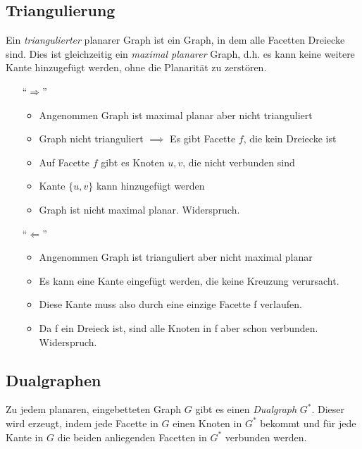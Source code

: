 \documentclass[10pt,a4paper]{article}
\begin{document}
\subsection{Triangulierung}
Ein \textit{triangulierter} planarer Graph ist ein Graph, in dem alle Facetten
Dreiecke sind.
Dies ist gleichzeitig ein \textit{maximal planarer} Graph, d.h. es kann keine
weitere Kante hinzugefügt werden, ohne die Planarität zu zerstören.
\begin{itemize}
    \item[\enquote{$\Longrightarrow$}]
        \begin{itemize}
            \item Angenommen Graph ist maximal planar aber nicht trianguliert
            \item Graph nicht trianguliert $\implies$ Es gibt Facette $f$, die
                kein Dreiecke ist
            \item Auf Facette $f$ gibt es Knoten $u, v$, die nicht verbunden
                sind
            \item Kante $\{u, v\}$ kann hinzugefügt werden
            \item Graph ist nicht maximal planar. Widerspruch.
        \end{itemize}
    \item[\enquote{$\Longleftarrow$}]
        \begin{itemize}
            \item Angenommen Graph ist trianguliert aber nicht maximal planar
            \item Es kann eine Kante eingefügt werden, die keine Kreuzung
                verursacht.
            \item Diese Kante muss also durch eine einzige Facette f verlaufen.
            \item Da f ein Dreieck ist, sind alle Knoten in f aber schon
                verbunden. Widerspruch.
        \end{itemize}
\end{itemize}

\subsection{Dualgraphen}
Zu jedem planaren, eingebetteten Graph $G$ gibt es einen \textit{Dualgraph}
$G^*$.
Dieser wird erzeugt, indem jede Facette in $G$ einen Knoten in $G^*$ bekommt
und für jede Kante in $G$ die beiden anliegenden Facetten in $G^*$ verbunden
werden.
\end{document}
